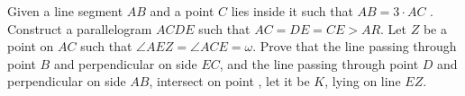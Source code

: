 Given a line segment $AB$ and a point $C$ lies inside it such that $AB=3 \cdot AC$ . Construct a parallelogram $ACDE$ such that $AC=DE=CE>AR$. Let $Z$ be a point on $AC$ such that $\angle AEZ=\angle ACE =\omega$. Prove that the line passing through point $B$ and perpendicular on side $EC$, and the line passing through point $D$  and perpendicular on side $AB$, intersect on point , let it be $K$, lying on line $EZ$.